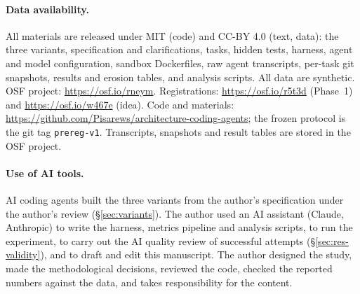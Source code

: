 \documentclass[10pt]{article}
\newcommand{\code}[1]{\texttt{#1}}
\begin{document}
\paragraph{Data availability.} All materials are released under MIT (code) and CC-BY 4.0 (text,
data): the three variants, specification and clarifications, tasks, hidden tests, harness, agent
and model configuration, sandbox Dockerfiles, raw agent transcripts, per-task git snapshots,
results and erosion tables, and analysis scripts. All data are synthetic. OSF project:
\url{https://osf.io/rneym}. Registrations: \url{https://osf.io/r5t3d} (Phase~1) and
\url{https://osf.io/w467e} (idea). Code and materials:
\url{https://github.com/Pisarews/architecture-coding-agents}; the frozen protocol is the git tag
\code{prereg-v1}. Transcripts, snapshots and result tables are stored in the OSF project.

\paragraph{Use of AI tools.} AI coding agents built the three variants from the author's
specification under the author's review (\S\ref{sec:variants}). The author used an AI assistant
(Claude, Anthropic) to write the harness, metrics pipeline and analysis scripts, to run the
experiment, to carry out the AI quality review of successful attempts (\S\ref{sec:res-validity}),
and to draft and edit this manuscript. The author designed the study, made the methodological
decisions, reviewed the code, checked the reported numbers against the data, and takes
responsibility for the content.



\end{document}
